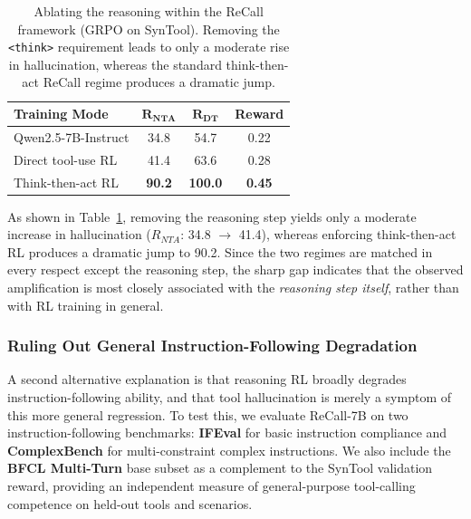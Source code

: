 \documentclass[11pt]{article}
\begin{document}
\begin{table}[h]
\centering
\small
\caption{Ablating the reasoning within the ReCall framework (GRPO on SynTool). Removing the \texttt{<think>} requirement leads to only a moderate rise in hallucination, whereas the standard think-then-act ReCall regime produces a dramatic jump.}
\label{tab:no_think}
\begin{tabular}{lccc}
\toprule
\textbf{Training Mode} & $\mathbf{R_{NTA}}$ & $\mathbf{R_{DT}}$ & \textbf{Reward} \\
\midrule
Qwen2.5-7B-Instruct & 34.8 & 54.7 & 0.22 \\
Direct tool-use RL & 41.4 & 63.6 & 0.28 \\
Think-then-act RL & \textbf{90.2} & \textbf{100.0} & \textbf{0.45} \\
\bottomrule
\end{tabular}
\end{table}

As shown in Table~\ref{tab:no_think}, removing the reasoning step yields only a moderate increase in hallucination ($R_{NTA}$: 34.8 $\rightarrow$ 41.4), whereas enforcing think-then-act RL produces a dramatic jump to 90.2. Since the two regimes are matched in every respect except the reasoning step, the sharp gap indicates that the observed amplification is most closely associated with the \emph{reasoning step itself}, rather than with RL training in general.

\subsubsection{Ruling Out General Instruction-Following Degradation}
\label{sec:ifeval}

A second alternative explanation is that reasoning RL broadly degrades instruction-following ability, and that tool hallucination is merely a symptom of this more general regression. To test this, we evaluate ReCall-7B on two instruction-following benchmarks: \textbf{IFEval} \citep{zhou2023instruction} for basic instruction compliance and \textbf{ComplexBench} \citep{wen2024benchmarking} for multi-constraint complex instructions. We also include the \textbf{BFCL Multi-Turn} \citep{patil2025the} base subset as a complement to the SynTool validation reward, providing an independent measure of general-purpose tool-calling competence on held-out tools and scenarios.
\end{document}
